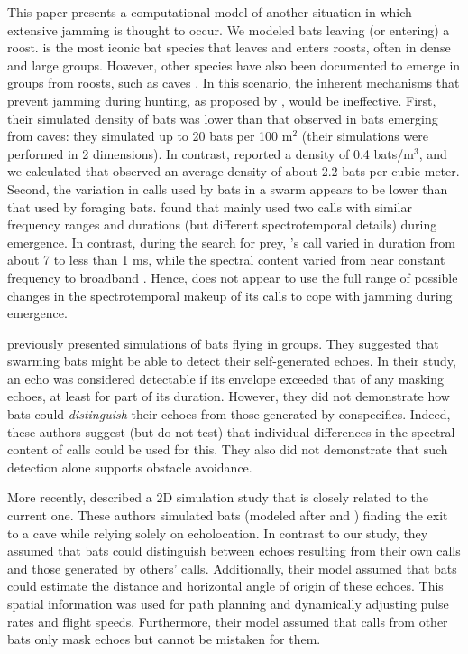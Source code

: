 \documentclass[a4paper, 11pt]{article}
\begin{document}
This paper presents a computational model of another situation in which extensive jamming is thought to occur. We modeled bats leaving (or entering) a roost.  is the most iconic bat species that leaves \citep{Kloepper2016} and enters \citep{Pudlo2019} roosts, often in dense and large groups. However, other species have also been documented to emerge in groups from roosts, such as caves \citep{Glover2008,Lin2016}. In this scenario, the inherent mechanisms that prevent jamming during hunting, as proposed by \citet{Mazar2020}, would be ineffective. First, their simulated density of bats was lower than that observed in bats emerging from caves: they simulated up to 20 bats per 100 m$^2$ (their simulations were performed in 2 dimensions). In contrast, \citet{Lin2016} reported a density of 0.4 bats/m$^3$, and we calculated that \citet{Weesner2023} observed an average density of about 2.2 bats per cubic meter. Second, the variation in calls used by bats in a swarm appears to be lower than that used by foraging bats. \citet{Gillam2010} found that  mainly used two calls with similar frequency ranges and durations (but different spectrotemporal details) during emergence. In contrast, during the search for prey, 's call varied in duration from about 7 to less than 1 ms, while the spectral content varied from near constant frequency to broadband \citep{Simmons1978}. Hence,  does not appear to use the full range of possible changes in the spectrotemporal makeup of its calls to cope with jamming during emergence.

\citet{Beleyur2019} previously presented simulations of bats flying in groups. They suggested that swarming bats might be able to detect their self-generated echoes. In their study, an echo was considered detectable if its envelope exceeded that of any masking echoes, at least for part of its duration. However, they did not demonstrate how bats could \emph{distinguish} their echoes from those generated by conspecifics. Indeed, these authors suggest (but do not test) that individual differences in the spectral content of calls could be used for this. They also did not demonstrate that such detection alone supports obstacle avoidance.

More recently, \citet{Mazar2024} described a 2D simulation study that is closely related to the current one. These authors simulated bats (modeled after  and ) finding the exit to a cave while relying solely on echolocation. In contrast to our study, they assumed that bats could distinguish between echoes resulting from their own calls and those generated by others' calls. Additionally, their model assumed that bats could estimate the distance and horizontal angle of origin of these echoes. This spatial information was used for path planning and dynamically adjusting pulse rates and flight speeds. Furthermore, their model assumed that calls from other bats only mask echoes but cannot be mistaken for them.
\end{document}
